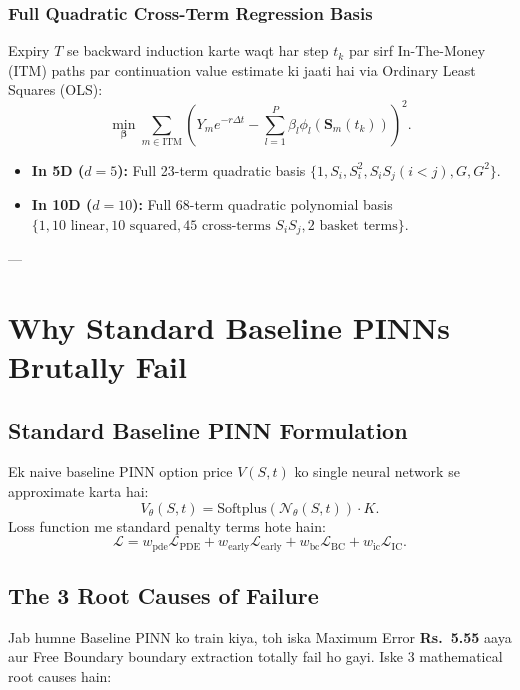 \documentclass[11pt,a4paper,oneside]{book}
\begin{document}
\subsection{Full Quadratic Cross-Term Regression Basis}
Expiry $T$ se backward induction karte waqt har step $t_k$ par sirf In-The-Money (ITM) paths par continuation value estimate ki jaati hai via Ordinary Least Squares (OLS):
\begin{equation}
    \min_{\boldsymbol{\beta}} \sum_{m \in \text{ITM}} \left( Y_m e^{-r\Delta t} - \sum_{l=1}^P \beta_l \phi_l(\mathbf{S}_m(t_k)) \right)^2.
\end{equation}
\begin{itemize}
    \item \textbf{In 5D ($d=5$):} Full 23-term quadratic basis $\{1, S_i, S_i^2, S_i S_j (i < j), G, G^2\}$.
    \item \textbf{In 10D ($d=10$):} Full 68-term quadratic polynomial basis $\{1, 10\text{ linear}, 10\text{ squared}, 45\text{ cross-terms } S_i S_j, 2\text{ basket terms}\}$.
\end{itemize}

---

\chapter{Why Standard Baseline PINNs Brutally Fail}

\section{Standard Baseline PINN Formulation}
Ek naive baseline PINN option price $V(S, t)$ ko single neural network se approximate karta hai:
\begin{equation}
    V_\theta(S, t) = \text{Softplus}(\mathcal{N}_\theta(S, t)) \cdot K.
\end{equation}
Loss function me standard penalty terms hote hain:
\begin{equation}
    \mathcal{L} = w_{\text{pde}} \mathcal{L}_{\text{PDE}} + w_{\text{early}} \mathcal{L}_{\text{early}} + w_{\text{bc}} \mathcal{L}_{\text{BC}} + w_{\text{ic}} \mathcal{L}_{\text{IC}}.
\end{equation}

\section{The 3 Root Causes of Failure}
Jab humne Baseline PINN ko train kiya, toh iska Maximum Error \textbf{Rs.~5.55} aaya aur Free Boundary boundary extraction totally fail ho gayi. Iske 3 mathematical root causes hain:
\end{document}
